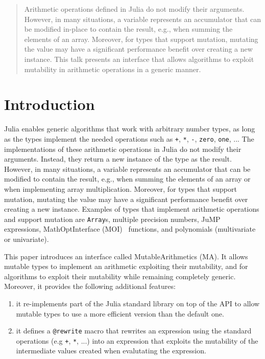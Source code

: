 \documentclass{juliacon}
\begin{document}


\maketitle

\begin{abstract}

Arithmetic operations defined in Julia do not modify their arguments.
However, in many situations, a variable represents an accumulator that can be modified in-place to contain the result, e.g., when summing the elements of an array.
Moreover, for types that support mutation, mutating the value may have a significant performance benefit over creating a new instance.
This talk presents an interface that allows algorithms to exploit mutability in arithmetic operations in a generic manner.

\end{abstract}

\section{Introduction}

Julia enables generic algorithms that work with arbitrary number types, as long as the types implement the needed operations
such as \texttt{+}, \texttt{*}, \texttt{-}, \texttt{zero}, \texttt{one}, ...
The implementations of these arithmetic operations in Julia do not modify their arguments. Instead, they return a new instance of the type as the result.
However, in many situations, a variable represents an accumulator that can be modified to contain the result, e.g.,
when summing the elements of an array or when implementing array multiplication.
Moreover, for types that support mutation, mutating the value may have a significant performance benefit over creating a new instance.
Examples of types that implement arithmetic operations and support mutation are \texttt{Array}s, multiple precision numbers, JuMP~\cite{dunning2017jump} expressions, MathOptInterface (MOI)~\cite{legat2021mathoptinterface} functions, and polynomials (multivariate~\cite{legat2021multivariatepolynomials} or univariate).

This paper introduces an interface called MutableArithmetics (MA).
It allows mutable types to implement an arithmetic exploiting their mutability, and for algorithms to
exploit their mutability while remaining completely generic.
Moreover, it provides the following additional features:
\begin{enumerate}
  \item
    \label{item:reimplement}
    it re-implements part of the Julia standard library on top of the API to allow mutable types to use a more efficient version than the default one.
  \item
    \label{item:rewrite}
    it defines a \texttt{@rewrite} macro that rewrites an expression using the standard operations (e.g \texttt{+}, \texttt{*}, ...) into an expression that exploits the mutability of the intermediate values created when evalutating the expression.
\end{enumerate}
\end{document}
